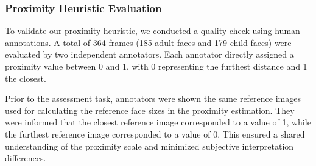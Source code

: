 \documentclass[
  man,floatsintext]{apa6}
\begin{document}
\subsubsection{Proximity Heuristic Evaluation}\label{proximity-heuristic-evaluation}

To validate our proximity heuristic, we conducted a quality check using human annotations. A total of 364 frames (185 adult faces and 179 child faces) were evaluated by two independent annotators. Each annotator directly assigned a proximity value between 0 and 1, with 0 representing the furthest distance and 1 the closest.

Prior to the assessment task, annotators were shown the same reference images used for calculating the reference face sizes in the proximity estimation. They were informed that the closest reference image corresponded to a value of 1, while the furthest reference image corresponded to a value of 0. This ensured a shared understanding of the proximity scale and minimized subjective interpretation differences.

\begin{table}
\centering
\caption{\label{tab:proximity-metrics}Proximity evaluation metrics. The table shows the Pearson correlation coefficient (Pearson), Mean Absolute Error (MAE), Root Mean Squared Error (RMSE), Coefficient of Determination (R²), and Bias for the proximity heuristic compared to human annotations.}
\centering
{}
\end{table}
\end{document}
